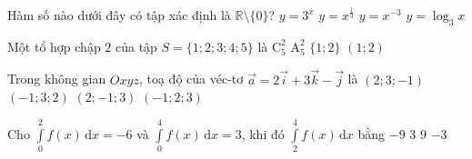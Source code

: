 \begin{ex}%
	Hàm số nào dưới đây có tập xác định là $\mathbb{R} \setminus \{0\}$?
	\choice
	{$y=3^x$}
	{$y=x^{\tfrac{1}{3}}$}
	{\True $y=x^{-3}$}
	{$y=\log _3 x$}
\end{ex}

\begin{ex}%
	Một tổ hợp chập $2$ của tập $S=\{1;2;3;4;5\}$ là
	\choice
	{$\mathrm{C}_5^2$}
	{$\mathrm{A}_5^2$}
	{\True $\{1;2\}$}
	{$(1;2)$}
\end{ex}

\begin{ex}%
	Trong không gian $Oxyz$, toạ độ của véc-tơ $\overrightarrow{a}=2 \overrightarrow{i}+3 \overrightarrow{k}-\overrightarrow{j}$ là
	\choice
	{$(2;3;-1)$}
	{$(-1;3;2)$}
	{\True $(2;-1;3)$}
	{$(-1;2;3)$}
\end{ex}

\begin{ex}%
	Cho $\displaystyle\int\limits_0^2 f(x) \mathrm{\,d}x=-6$ và $\displaystyle\int\limits_0^4 f(x)\mathrm{\,d}x=3$, khi đó $\displaystyle\int\limits_2^4 f(x)\mathrm{\,d}x$ bằng
	\choice
	{$-9$}
	{$3$}
	{\True $9$}
	{$-3$}
\end{ex}

